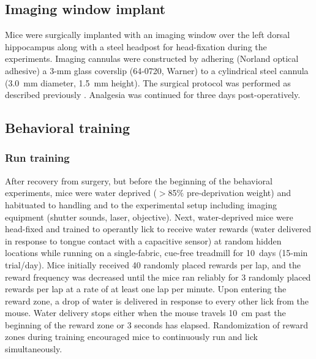 \subsection{Imaging window implant}

Mice were surgically implanted with an imaging window over the left dorsal hippocampus along with a steel headpost for head-fixation during the experiments. Imaging cannulas were constructed by adhering (Norland optical adhesive) a 3-mm glass coverslip (64-0720, Warner) to a cylindrical steel cannula (3.0~mm diameter, 1.5~mm height).  The surgical protocol was performed as described previously \citep{Kaifosh2013, Lovett-Barron2014, Danielson2016b}. Analgesia was continued for three days post-operatively.

\subsection{Behavioral training}\label{sec:methods:training}
\subsubsection{Run training}
After recovery from surgery, but before the beginning of the behavioral experiments, mice were water deprived ($>$85$\%$ pre-deprivation weight) and habituated to handling and to the experimental setup including imaging equipment (shutter sounds, laser, objective). Next, water-deprived mice were head-fixed and trained to operantly lick to receive water rewards (water delivered in response to tongue contact with a capacitive sensor) at random hidden locations while running on a single-fabric, cue-free treadmill for 10~days (15-min trial/day). Mice initially received 40 randomly placed rewards per lap, and the reward frequency was decreased until the mice ran reliably for 3 randomly placed rewards per lap at a rate of at least one lap per minute. Upon entering the reward zone, a drop of water is delivered in response to every other lick from the mouse. Water delivery stops either when the mouse travels 10~cm past the beginning of the reward zone or 3 seconds has elapsed. Randomization of reward zones during training encouraged mice to continuously run and lick simultaneously.
